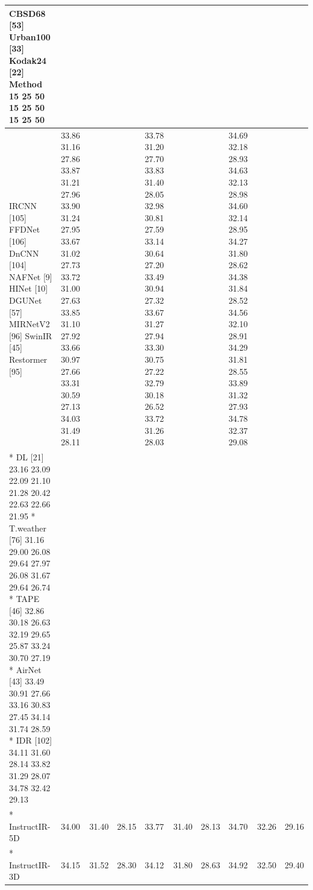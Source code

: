 \begin{tabular}{llllllllll}
\toprule
CBSD68 [53] Urban100 [33] Kodak24 [22] Method 15 25 50 15 25 50 15 25 50 &  &  &  &  &  &  &  &  &  \\
\midrule
IRCNN [105] FFDNet [106] DnCNN [104] NAFNet [9] HINet [10] DGUNet [57] MIRNetV2 [96] SwinIR [45] Restormer [95] & 33.86 31.16 27.86 33.87 31.21 27.96 33.90 31.24 27.95 33.67 31.02 27.73 33.72 31.00 27.63 33.85 31.10 27.92 33.66 30.97 27.66 33.31 30.59 27.13 34.03 31.49 28.11 &  &  & 33.78 31.20 27.70 33.83 31.40 28.05 32.98 30.81 27.59 33.14 30.64 27.20 33.49 30.94 27.32 33.67 31.27 27.94 33.30 30.75 27.22 32.79 30.18 26.52 33.72 31.26 28.03 &  &  & 34.69 32.18 28.93 34.63 32.13 28.98 34.60 32.14 28.95 34.27 31.80 28.62 34.38 31.84 28.52 34.56 32.10 28.91 34.29 31.81 28.55 33.89 31.32 27.93 34.78 32.37 29.08 &  &  \\
* DL [21] 23.16 23.09 22.09 21.10 21.28 20.42 22.63 22.66 21.95 * T.weather [76] 31.16 29.00 26.08 29.64 27.97 26.08 31.67 29.64 26.74 * TAPE [46] 32.86 30.18 26.63 32.19 29.65 25.87 33.24 30.70 27.19 * AirNet [43] 33.49 30.91 27.66 33.16 30.83 27.45 34.14 31.74 28.59 * IDR [102] 34.11 31.60 28.14 33.82 31.29 28.07 34.78 32.42 29.13 &  &  &  &  &  &  &  &  &  \\
* InstructIR-5D & 34.00 & 31.40 & 28.15 & 33.77 & 31.40 & 28.13 & 34.70 & 32.26 & 29.16 \\
* InstructIR-3D & 34.15 & 31.52 & 28.30 & 34.12 & 31.80 & 28.63 & 34.92 & 32.50 & 29.40 \\
\bottomrule
\end{tabular}
